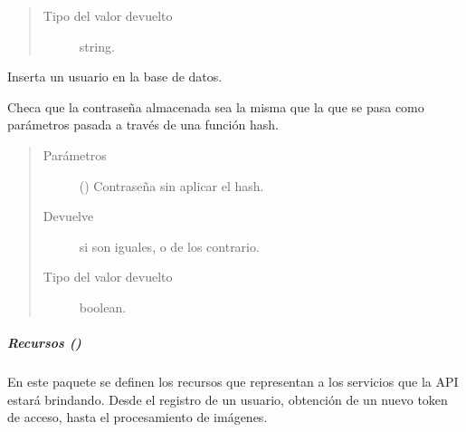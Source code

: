 \begin{fulllineitems}
\begin{fulllineitems}
\begin{quote}
\begin{description}
\item[{Tipo del valor devuelto}] \leavevmode
string.

\end{description}\end{quote}

\end{fulllineitems}


\begin{fulllineitems}
\label{\detokenize{chapter_two/desc_cloudnao:app.models.user_model.UserModel.save_to_db}}
Inserta un usuario en la base de datos.

\end{fulllineitems}


\begin{fulllineitems}
\label{\detokenize{chapter_two/desc_cloudnao:app.models.user_model.UserModel.verify_password}}
Checa que la contraseña almacenada sea la misma que la que se pasa
como parámetros pasada a través de una función hash.
\begin{quote}\begin{description}
\item[{Parámetros}] \leavevmode
{} () \textendash{} Contraseña sin aplicar el hash.

\item[{Devuelve}] \leavevmode
{} si son iguales, o  de los contrario.

\item[{Tipo del valor devuelto}] \leavevmode
boolean.

\end{description}\end{quote}

\end{fulllineitems}


\end{fulllineitems}



\subparagraph{Recursos ()}
\label{\detokenize{chapter_two/desc_cloudnao:recursos-resources}}\label{\detokenize{chapter_two/desc_cloudnao:module-app.resources}}
En este paquete se definen los recursos que representan a los servicios que
la API estará brindando. Desde el registro de un usuario, obtención de un nuevo
token de acceso, hasta el procesamiento de imágenes.
\label{\detokenize{chapter_two/desc_cloudnao:module-app.resources.user}}\label{\detokenize{chapter_two/desc_cloudnao:module-user}}

